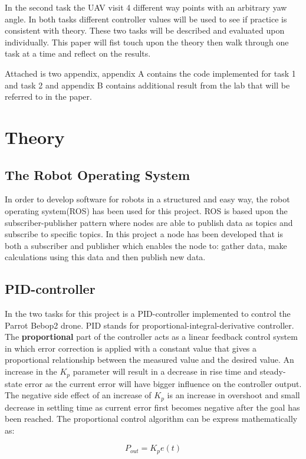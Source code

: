 \documentclass[conference]{IEEEtran}
\begin{document}
In the second task the UAV visit 4 different way points with an arbitrary yaw angle.  
In both tasks different controller values will be used to see if practice is consistent with theory. These two tasks will be described and evaluated upon individually. This paper will fist touch upon the theory then walk through one task at a time and reflect on the results.

Attached is two appendix, appendix A contains the code implemented for task 1 and task 2 and appendix B contains additional result from the lab that will be referred to in the paper.   

\section{Theory}\label{theory}
\subsection{The Robot Operating System}
In order to develop software for robots in a structured and easy way, the robot operating system(ROS)\cite{ros} has been used for this project. ROS is based upon the subscriber-publisher pattern where nodes are able to publish data as topics and subscribe to specific topics. In this project a node has been developed that is both a subscriber and publisher which enables the node to: gather data, make calculations using this data and then publish new data. 

\subsection{PID-controller}
In the two tasks for this project is a PID-controller implemented to control the Parrot Bebop2 drone. PID stands for proportional-integral-derivative controller. The \textbf{proportional} part of the controller acts as a linear feedback control system in which error correction is applied with a constant value that gives a proportional relationship between the measured value and the desired value. An increase in the $K_p$ parameter will result in a decrease in rise time and steady-state error as the current error will have bigger influence on the controller output. The negative side effect of an increase of $K_p$ is an increase in overshoot and small decrease in settling time as current error first becomes negative after the goal has been reached. The proportional control algorithm can be express mathematically as:

\begin{equation}
P_{out} = K_p e(t) \label{eq1}
\end{equation}
\end{document}
